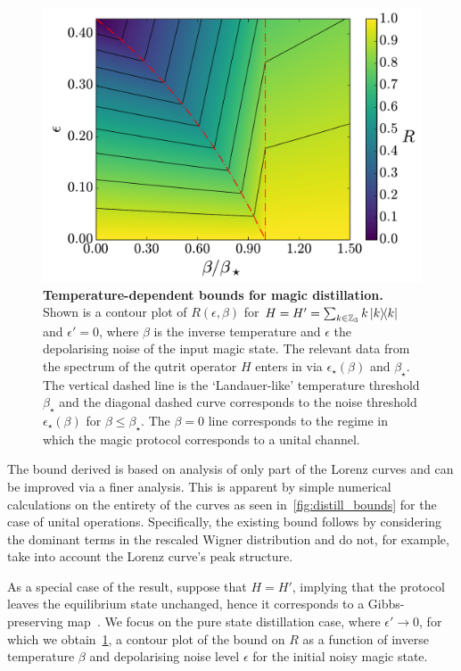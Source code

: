 \documentclass[pra,
aps,
twocolumn,
superscriptaddress,
groupedaddress,
nofootinbib,
reprint
]{revtex4-1}
\begin{document}
\begin{figure}[t!]
    \centering
    \includegraphics[scale=0.4]{figs/rate_scatter.pdf}
    \caption{\textbf{Temperature-dependent bounds for magic distillation.}
  Shown is a contour plot of  $R(\epsilon, \beta)$ for $H = H' = \sum_{k \in \mathbb{Z}_3} k \ketbra{k}$ and $\epsilon' = 0$, where $\beta$ is the inverse temperature and $\epsilon$ the depolarising noise of the input magic state. The relevant data from the spectrum of the qutrit operator $H$ enters in via $\epsilon_\star(\beta)$ and $\beta_\star$. The vertical dashed line is the `Landauer-like' temperature threshold $\beta_\star$ and the diagonal dashed curve corresponds to the noise threshold $\epsilon_\star(\beta)$ for $\beta \leq \beta_\star$.  The $\beta = 0$ line corresponds to the regime in which the magic protocol corresponds to a unital channel.
    }
    \label{fig:rate_contour}
\end{figure}

The bound derived is based on analysis of only part of the Lorenz curves and can be improved via a finer analysis.
This is apparent by simple numerical calculations on the entirety of the curves as seen in~\cref{fig:distill_bounds} for the case of unital operations.
Specifically, the existing bound follows by considering the dominant terms in the rescaled Wigner distribution and do not, for example, take into account the Lorenz curve's peak structure. 

As a special case of the result, suppose that $H=H'$, implying that the protocol leaves the equilibrium state unchanged, hence it corresponds to a Gibbs-preserving map~\cite{faist_2015}. We focus on the pure state distillation case, where $\epsilon' \rightarrow 0$, for which we obtain~\cref{fig:rate_contour}, a contour plot of the bound on $R$ as a function of inverse temperature $\beta$ and depolarising noise level $\epsilon$ for the initial noisy magic state.
\end{document}
